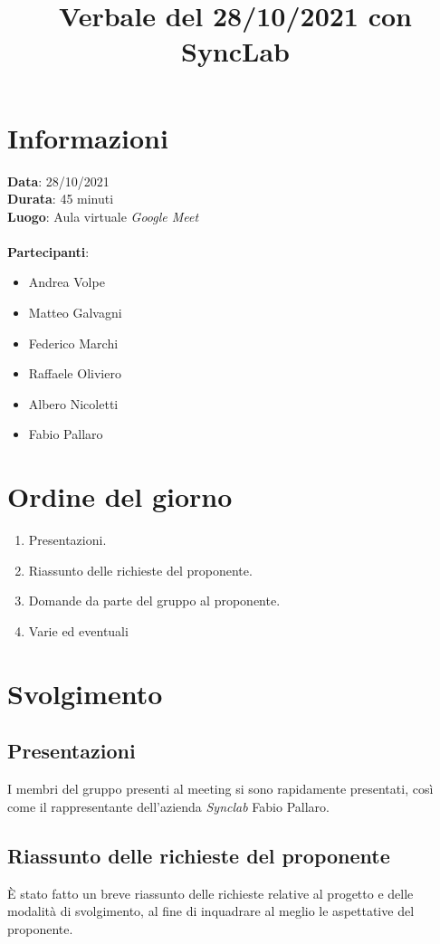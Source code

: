 \documentclass[a4paper,12pt]{article}
\author{}
\date{}
\begin{document}
\title{Verbale del 28/10/2021 con SyncLab}
\maketitle

\section{Informazioni}
\textbf{Data}: 28/10/2021\\
\textbf{Durata}: 45 minuti\\
\textbf{Luogo}: Aula virtuale \textit{Google Meet}\\\\

\textbf{Partecipanti}:
\begin{itemize}
	\item Andrea Volpe
	\item Matteo Galvagni
	\item Federico Marchi
	\item Raffaele Oliviero
	\item Albero Nicoletti
	\item Fabio Pallaro
\end{itemize}

\section{Ordine del giorno}
\begin{enumerate}
    \item Presentazioni.
    \item Riassunto delle richieste del proponente.
    \item Domande da parte del gruppo al proponente.
    \item Varie ed eventuali
\end{enumerate}

\section{Svolgimento}

\subsection{Presentazioni}
I membri del gruppo presenti al meeting si sono rapidamente presentati, così come il rappresentante dell'azienda \textit{Synclab} Fabio Pallaro.

\subsection{Riassunto delle richieste del proponente}
È stato fatto un breve riassunto delle richieste relative al progetto e delle modalità di svolgimento, al fine di inquadrare al meglio le aspettative del proponente.
\end{document}
